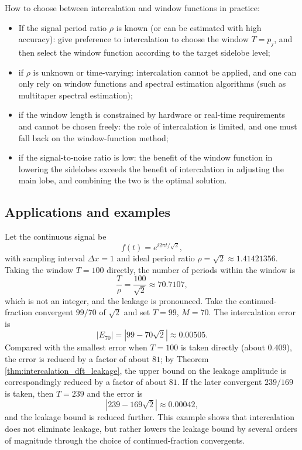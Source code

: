 \begin{remark}\label{rem:method_selection_advice}
How to choose between intercalation and window functions in practice:
\begin{itemize}
    \item If the signal period ratio $\rho$ is known (or can be estimated with high accuracy): give preference to intercalation to choose the window $T=p_j$, and then select the window function according to the target sidelobe level;
    \item if $\rho$ is unknown or time-varying: intercalation cannot be applied, and one can only rely on window functions and spectral estimation algorithms (such as multitaper spectral estimation);
    \item if the window length is constrained by hardware or real-time requirements and cannot be chosen freely: the role of intercalation is limited, and one must fall back on the window-function method;
    \item if the signal-to-noise ratio is low: the benefit of the window function in lowering the sidelobes exceeds the benefit of intercalation in adjusting the main lobe, and combining the two is the optimal solution.
\end{itemize}
\end{remark}

\subsection{Applications and examples}

\begin{example}\label{ex:single_tone_leakage}
Let the continuous signal be
\[
f(t)=e^{i2\pi t/\sqrt{2}},
\]
with sampling interval $\Delta x=1$ and ideal period ratio $\rho=\sqrt{2}\approx 1.41421356$. Taking the window $T=100$ directly, the number of periods within the window is
\[
\frac{T}{\rho}=\frac{100}{\sqrt{2}}\approx 70.7107,
\]
which is not an integer, and the leakage is pronounced. Take the continued-fraction convergent $99/70$ of $\sqrt{2}$ and set $T=99$, $M=70$. The intercalation error is
\[
|E_{70}|=|99-70\sqrt{2}|\approx 0.00505.
\]
Compared with the smallest error when $T=100$ is taken directly (about $0.409$), the error is reduced by a factor of about $81$; by Theorem \ref{thm:intercalation_dft_leakage}, the upper bound on the leakage amplitude is correspondingly reduced by a factor of about $81$. If the later convergent $239/169$ is taken, then $T=239$ and the error is
\[
|239-169\sqrt{2}|\approx 0.00042,
\]
and the leakage bound is reduced further. This example shows that intercalation does not eliminate leakage, but rather lowers the leakage bound by several orders of magnitude through the choice of continued-fraction convergents.
\end{example}

